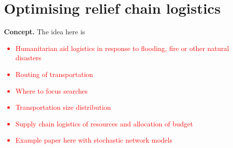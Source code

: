 \chapter{\sffamily Optimising relief chain logistics}

{\bfseries\sffamily Concept.} The idea here is 

\textcolor{red}{
\begin{itemize}
\item{Humanitarian aid logistics in response to flooding, fire or other natural disasters}
\item{Routing of transportation}
\item{Where to focus searches}
\item{Transportation size distribution}
\item{Supply chain logistics of resources and allocation of budget}
\item{Example paper here with stochastic network models~\cite{alem2016stochastic}}
\end{itemize}
}